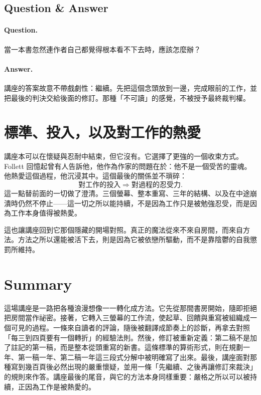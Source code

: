 \subsection{Question \& Answer}

\paragraph{Question.} 當一本書忽然連作者自己都覺得根本看不下去時，應該怎麼辦？

\paragraph{Answer.} 講座的答案故意不帶戲劇性：繼續。先把這個念頭放到一邊，完成眼前的工作，並把最後的判決交給後面的修訂。那種「不可讀」的感覺，不被授予最終裁判權。

\section{標準、投入，以及對工作的熱愛}

講座本可以在懷疑與忍耐中結束，但它沒有。它選擇了更強的一個收束方式。Follett 回憶起曾有人告訴他，他作為作家的問題在於：他不是一個受苦的靈魂。他熱愛這個過程，他沉浸其中。這個最後的關係並不瑣碎：
\begin{equation}
\text{對工作的投入} \Rightarrow \text{對過程的忍受力}.
\end{equation}
這一點替前面的一切做了澄清。三個螢幕、整本重寫、三年的結構、以及在中途崩潰時仍然不停止——這一切之所以能持續，不是因為工作只是被勉強忍受，而是因為工作本身值得被熱愛。

這也讓講座回到它那個隱藏的開場對照。真正的魔法從來不來自房間，而來自方法。方法之所以還能被活下去，則是因為它被依戀所驅動，而不是靠陰鬱的自我懲罰所維持。

\section{Summary}

這場講座是一路把各種浪漫想像一一轉化成方法。它先從那間書房開始，隨即拒絕把房間當作祕密。接著，它轉入三螢幕的工作流，使起草、回饋與重寫被組織成一個可見的過程。一條來自讀者的評論，隨後被翻譯成節奏上的診斷，再拿去對照「每三到四頁要有一個轉折」的經驗法則。然後，修訂被重新定義：第二稿不是加了註記的第一稿，而是整本從頭重寫的新書。這條標準的算術形式，則在規劃一年、第一稿一年、第二稿一年這三段式分解中被明確寫了出來。最後，講座面對那種寫到幾百頁後必然出現的嚴重懷疑，並用一條「先繼續、之後再讓修訂來裁決」的規則來作答。講座最後的尾音，與它的方法本身同樣重要：嚴格之所以可以被持續，正因為工作是被熱愛的。